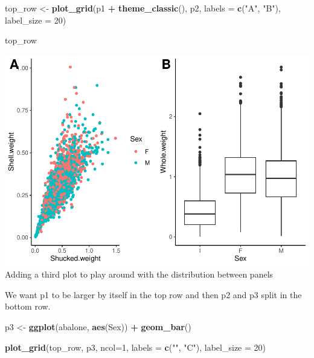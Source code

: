 \documentclass[
]{book}
\newenvironment{Shaded}{\begin{snugshade}}{\end{snugshade}}
\newcommand{\AttributeTok}[1]{\textcolor[rgb]{0.13,0.29,0.53}{#1}}
\newcommand{\DecValTok}[1]{\textcolor[rgb]{0.00,0.00,0.81}{#1}}
\newcommand{\FunctionTok}[1]{\textcolor[rgb]{0.13,0.29,0.53}{\textbf{#1}}}
\newcommand{\NormalTok}[1]{#1}
\newcommand{\OtherTok}[1]{\textcolor[rgb]{0.56,0.35,0.01}{#1}}
\newcommand{\SpecialCharTok}[1]{\textcolor[rgb]{0.81,0.36,0.00}{\textbf{#1}}}
\newcommand{\StringTok}[1]{\textcolor[rgb]{0.31,0.60,0.02}{#1}}
\begin{document}
\begin{Shaded}
\begin{Highlighting}[]
\NormalTok{top\_row }\OtherTok{\textless{}{-}} \FunctionTok{plot\_grid}\NormalTok{(p1 }\SpecialCharTok{+} \FunctionTok{theme\_classic}\NormalTok{(), }
\NormalTok{          p2, }
          \AttributeTok{labels =} \FunctionTok{c}\NormalTok{(}\StringTok{"A"}\NormalTok{, }\StringTok{"B"}\NormalTok{), }
          \AttributeTok{label\_size =} \DecValTok{20}\NormalTok{)}

\NormalTok{top\_row}
\end{Highlighting}
\end{Shaded}

\includegraphics{_main_files/figure-latex/unnamed-chunk-54-1.pdf}
Adding a third plot to play around with the distribution between panels

We want p1 to be larger by itself in the top row and then p2 and p3 split in the bottom row.

\begin{Shaded}
\begin{Highlighting}[]
\NormalTok{p3 }\OtherTok{\textless{}{-}} \FunctionTok{ggplot}\NormalTok{(abalone, }\FunctionTok{aes}\NormalTok{(Sex)) }\SpecialCharTok{+} \FunctionTok{geom\_bar}\NormalTok{()}

\FunctionTok{plot\_grid}\NormalTok{(top\_row, p3, }\AttributeTok{ncol=}\DecValTok{1}\NormalTok{, }
          \AttributeTok{labels =} \FunctionTok{c}\NormalTok{(}\StringTok{""}\NormalTok{, }\StringTok{"C"}\NormalTok{), }
          \AttributeTok{label\_size =} \DecValTok{20}\NormalTok{)}
\end{Highlighting}
\end{Shaded}
\end{document}
